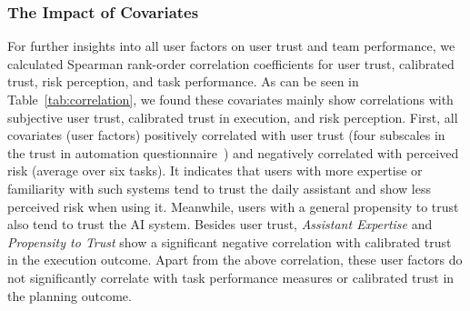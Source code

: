 \subsubsection{The Impact of Covariates}
For further insights into all user factors on user trust and team performance, we calculated Spearman rank-order correlation coefficients for user trust, calibrated trust, risk perception, and task performance. 
As can be seen in Table~\ref{tab:correlation}, we found these covariates mainly show correlations with subjective user trust, calibrated trust in execution, and risk perception. 
First, all covariates (\ie user factors) positively correlated with user trust (four subscales in the trust in automation questionnaire~\cite{korber2019theoretical}) and negatively correlated with perceived risk (average over six tasks). 
It indicates that users with more expertise or familiarity with such systems tend to trust the daily assistant and show less perceived risk when using it. 
Meanwhile, users with a general propensity to trust also tend to trust the AI system. 
Besides user trust, \textit{Assistant Expertise} and \textit{Propensity to Trust} show a significant negative correlation with calibrated trust in the execution outcome. 
Apart from the above correlation, these user factors do not significantly correlate with task performance measures or calibrated trust in the planning outcome.

